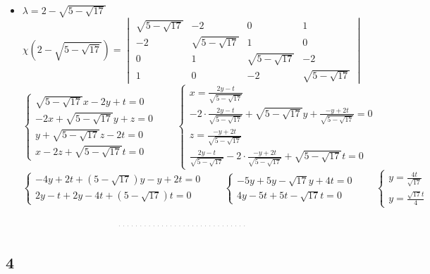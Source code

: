 \begin{itemize}
    \item $ \lambda = 2 - \sqrt{5 - \sqrt{17}} $
    $$ \chi(2 - \sqrt{5 - \sqrt{17}}) =
    \begin{vmatrix}
    	\sqrt{5 - \sqrt{17}} & -2 & 0 & 1 \\
        -2 & \sqrt{5 - \sqrt{17}} & 1 & 0 \\
        0 & 1 & \sqrt{5 - \sqrt{17}} & -2 \\
        1 & 0 & -2 & \sqrt{5 - \sqrt{17}}
    \end{vmatrix} $$
    $$
    \begin{cases}
    	\sqrt{5 - \sqrt{17}}x - 2y + t = 0 \\
        -2x + \sqrt{5 - \sqrt{17}}y + z = 0 \\
        y + \sqrt{5 - \sqrt{17}}z - 2t = 0 \\
        x - 2z + \sqrt{5 - \sqrt{17}}t = 0
    \end{cases} \qquad
    \begin{cases}
        x = \frac{2y - t}{\sqrt{5 - \sqrt{17}}} \\
        -2 \cdot \frac{2y - t}{\sqrt{5 - \sqrt{17}}} + \sqrt{5 - \sqrt{17}}y + \frac{-y + 2t}{\sqrt{5 - \sqrt{17}}} = 0 \\
        z = \frac{-y + 2t}{\sqrt{5 - \sqrt{17}}} \\
        \frac{2y - t}{\sqrt{5 - \sqrt{17}}} - 2 \cdot \frac{-y + 2t}{\sqrt{5 - \sqrt{17}}} + \sqrt{5 - \sqrt{17}}t = 0
    \end{cases} $$
    $$
    \begin{cases}
        -4y + 2t + (5 - \sqrt{17})y - y + 2t = 0 \\
        2y - t + 2y - 4t + (5 - \sqrt{17})t = 0
    \end{cases} \qquad
    \begin{cases}
        -5y + 5y - \sqrt{17}y + 4t = 0 \\
        4y - 5t + 5t - \sqrt{17}t = 0
    \end{cases} \qquad
    \begin{cases}
        y = \frac{4t}{\sqrt{17}} \\
        y = \frac{\sqrt{17}t}4
    \end{cases} $$
\end{itemize}
$$ \widedots $$

\subsection{4}

